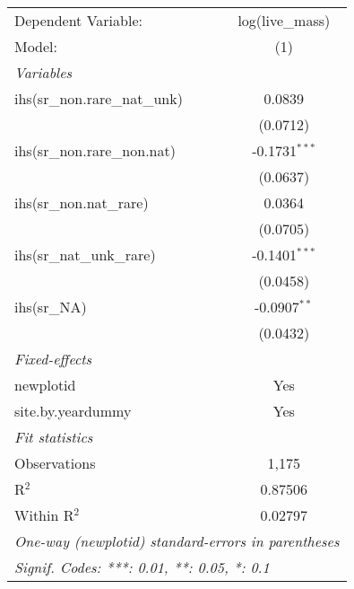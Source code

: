 \begin{tabular}{lc}
\tabularnewline\midrule\midrule
Dependent Variable:&log(live\_mass)\\
Model:&(1)\\
\midrule \emph{Variables}&  \\
ihs(sr\_non.rare\_nat\_unk)&0.0839\\
  &(0.0712)\\
ihs(sr\_non.rare\_non.nat)&-0.1731$^{***}$\\
  &(0.0637)\\
ihs(sr\_non.nat\_rare)&0.0364\\
  &(0.0705)\\
ihs(sr\_nat\_unk\_rare)&-0.1401$^{***}$\\
  &(0.0458)\\
ihs(sr\_NA)&-0.0907$^{**}$\\
  &(0.0432)\\
\midrule \emph{Fixed-effects}&  \\
newplotid & Yes\\
site.by.yeardummy & Yes\\
\midrule \emph{Fit statistics}&  \\
Observations & 1,175\\
R$^2$ & 0.87506\\
Within R$^2$ & 0.02797\\
\midrule\midrule\multicolumn{2}{l}{\emph{One-way (newplotid) standard-errors in parentheses}}\\
\multicolumn{2}{l}{\emph{Signif. Codes: ***: 0.01, **: 0.05, *: 0.1}}\\
\end{tabular}


